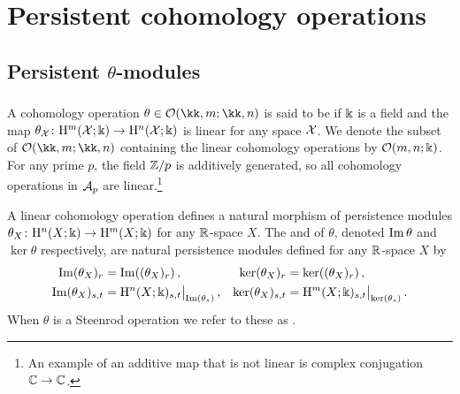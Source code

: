 
\section{Persistent cohomology operations}\label{s:steenrod}





\subsection{Persistent $\theta$-modules}

\subsubsection{}

A cohomology operation $\theta \in \cO(\kk,m; \kk,n)$ is said to be  if $\Bbbk$ is a field and the map $\theta_{\mathcal{X}} \colon \mathrm{H}^m(\mathcal{X}; \Bbbk) \to \mathrm{H}^n(\mathcal{X}; \Bbbk)$ is linear for any space $\mathcal{X}$.
We denote the subset of $\cO(\kk,m; \kk,n)$ containing the linear cohomology operations by $\mathcal{O}(m,n;\Bbbk)$.
For any prime $p$, the field $\mathbb{Z}/p$ is additively generated, so all cohomology operations in $\mathcal{A}_p$ are linear.\footnote{An example of an additive map that is not linear is complex conjugation $\mathbb{C} \to \mathbb{C}$.}

A linear cohomology operation defines a natural morphism of persistence modules $\theta_X \colon \mathrm{H}^n(X; \Bbbk) \to \mathrm{H}^m(X; \Bbbk)$ for any $\mathbb{R}$-space $X$.
The  and  of $\theta$, denoted $\operatorname{Im}\theta$ and $\ker\theta$ respectively, are natural persistence modules defined for any $\mathbb{R}$-space $X$ by
\begin{align*}
	\operatorname{Im}(\theta_X)_r &= \operatorname{Im}((\theta_X)_r)\,, &
	\ker(\theta_X)_r &= \ker((\theta_X)_r)\,, \\
	\operatorname{Im}(\theta_X)_{s,t} &= \mathrm{H}^n(X;\Bbbk)_{s,t}\big|_{\operatorname{Im}(\theta_s)}\,, &
	\ker(\theta_X)_{s,t} &= \mathrm{H}^m(X;\Bbbk)_{s,t}\big|_{\ker(\theta_s)}\,.
\end{align*}
When $\theta$ is a Steenrod operation we refer to these as .

